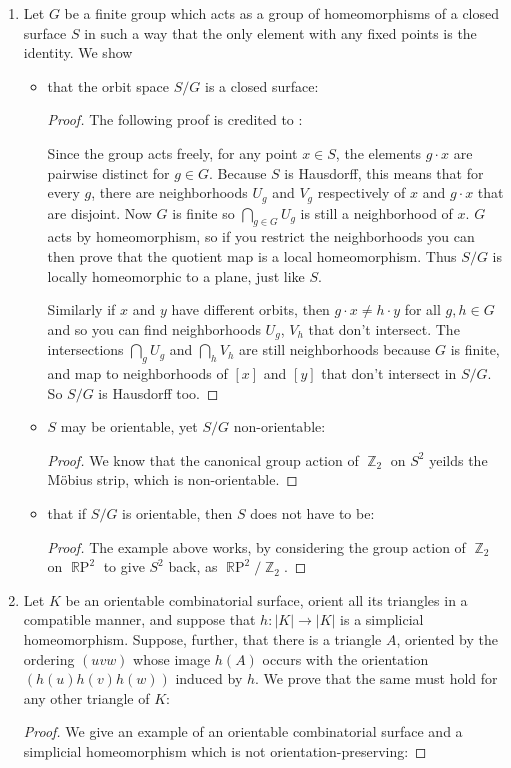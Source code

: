 \documentclass{book}
\DeclareMathOperator*{\R}{\mathbb{R}}
\DeclareMathOperator*{\RP}{\R\text{P}}
\DeclareMathOperator*{\Z}{\mathbb{Z}}
\begin{document}
\begin{enumerate}[(1)]
    \item Let $G$ be a finite group which acts as a group of homeomorphisms of a closed surface $S$ in such a way that the only element with any fixed points is the identity. We show 
        \begin{itemize}
            \item that the orbit space $S/G$ is a closed surface: 
                \begin{proof} The following proof is credited to \cite{groupActions}: 
                    \par Since the group acts freely, for any point $x \in S$, the elements $g \cdot x$ are pairwise distinct for $g \in G$. Because $S$ is Hausdorff, this means that for every $g$, there are neighborhoods $U_g$ and $V_g$ respectively of $x$ and $g \cdot x$ that are disjoint. Now $G$ is finite so $\bigcap_{g \in G} U_g$ is still a neighborhood of $x$. $G$ acts by homeomorphism, so if you restrict the neighborhoods you can then prove that the quotient map is a local homeomorphism. Thus $S/G$ is locally homeomorphic to a plane, just like $S$.
                    \par Similarly if $x$ and $y$ have different orbits, then $g \cdot x \neq h \cdot y$ for all $g,h \in G$ and so you can find neighborhoods $U_g$, $V_h$ that don't intersect. The intersections $\bigcap_g U_g$ and $\bigcap_h V_h$ are still neighborhoods because $G$ is finite, and map to neighborhoods of $[x]$ and $[y]$ that don't intersect in $S/G$. So $S/G$ is Hausdorff too.
                \end{proof}

            \item $S$ may be orientable, yet $S/G$ non-orientable: 
                \begin{proof} We know that the canonical group action of $\Z_2$ on $S^2$ yeilds the M\"obius strip, which is non-orientable. 
                \end{proof}

            \item that if $S/G$ is orientable, then $S$ does not have to be: 
                \begin{proof} The example above works, by considering the group action of $\Z_2$ on $\RP^2$ to give $S^2$ back, as $\RP^2/\Z_2$.
                \end{proof}
        \end{itemize}

    \item Let $K$ be an orientable combinatorial surface, orient all its triangles in a compatible manner, and suppose that $h: |K| \rightarrow |K|$ is a simplicial homeomorphism. Suppose, further, that there is a triangle $A$, oriented by the ordering $(uvw)$ whose image $h(A)$ occurs with the orientation $(h(u)h(v)h(w))$ induced by $h$. We prove that the same must hold for any other triangle of $K$: 
        \begin{proof}
            \par We give an example of an orientable combinatorial surface and a simplicial homeomorphism which is not orientation-preserving:
        \end{proof}


\end{enumerate}
\end{document}
